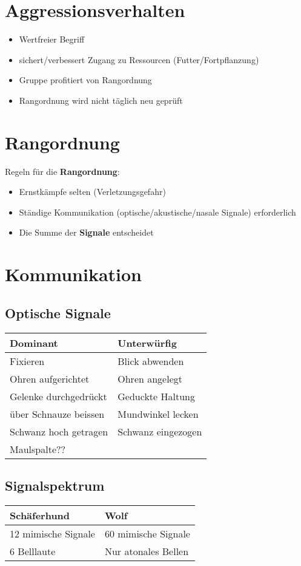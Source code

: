 \section{Aggressionsverhalten}
\begin{itemize}
    \item Wertfreier Begriff
    \item sichert/verbessert Zugang zu Ressourcen (Futter/Fortpflanzung)
    \item Gruppe profitiert von Rangordnung
    \item Rangordnung wird nicht täglich neu geprüft
\end{itemize}


\section{Rangordnung}
Regeln für die \textbf{Rangordnung}:
\begin{itemize}
    \item Ernstkämpfe selten (Verletzungsgefahr)
    \item Ständige Kommunikation (optische/akustische/nasale Signale) erforderlich
    \item Die Summe der \textbf{Signale} entscheidet
\end{itemize}


\section{Kommunikation}

    \subsection{Optische Signale}
    \begin{tabular}{l|l}
        \textbf{Dominant} & \textbf{Unterwürfig} \\
        \hline
        Fixieren & Blick abwenden \\
        Ohren aufgerichtet & Ohren angelegt \\
        Gelenke durchgedrückt & Geduckte Haltung \\
        über Schnauze beissen & Mundwinkel lecken \\
        Schwanz hoch getragen & Schwanz eingezogen \\
        Maulspalte?? \\
    \end{tabular}

    \subsection{Signalspektrum}
        \begin{tabular}{l|l}
            \textbf{Schäferhund} & \textbf{Wolf} \\
            \hline
            12 mimische Signale & 60 mimische Signale \\
            6 Belllaute & Nur atonales Bellen \\
        \end{tabular}

